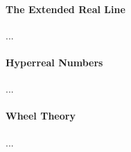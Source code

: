 \paragraph{The Extended Real Line}...

\paragraph{Hyperreal Numbers}...

\paragraph{Wheel Theory}...





